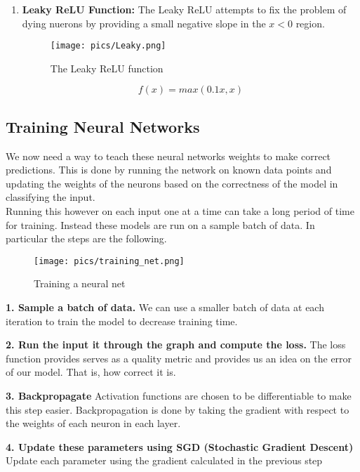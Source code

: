 \documentclass[twoside]{article}
\begin{document}
\begin{enumerate}
\item \textbf{Leaky ReLU Function:}
The Leaky ReLU attempts to fix the problem of dying nuerons by providing a small negative slope in the $x<0$ region.
\begin{figure}[!htb]
\centering
\texttt{[image: pics/Leaky.png]}
\caption{The Leaky ReLU function\cite{cs231n-website}}
\label{fig:ReLU}
\end{figure}
\begin{equation*}
f(x) = max( 0.1 x, x )
\end{equation*}

\end{enumerate}
\subsection{Training Neural Networks}
We now need a way to teach these neural networks weights to make correct predictions. This is done by running the network on known data points and updating the weights of the neurons based on the correctness of the model in classifying the input. \\

Running this however on each input one at a time can take a long period of time for training. Instead these models are run on a sample batch of data. In particular the steps are the following.\\

\begin{figure}[!htb]
\centering
\texttt{[image: pics/training\_net.png]}
\caption{Training a neural net\cite{}}
\label{fig:Training a neural net}
\end{figure}

\textbf{1. Sample a batch of data.}
We can use a smaller batch of data at each iteration to train the model to decrease training time.

\textbf{2. Run the input it through the graph and compute the loss.}
The loss function provides serves as a quality metric and provides us an idea on the error of our model. That is, how correct it is.

\textbf{3. Backpropagate}
Activation functions are chosen to be differentiable to make this step easier. Backpropagation is done by taking the gradient with respect to the weights of each neuron in each layer.

\textbf{4. Update these parameters using SGD (Stochastic Gradient Descent)}
Update each parameter using the gradient calculated in the previous step
\end{document}
